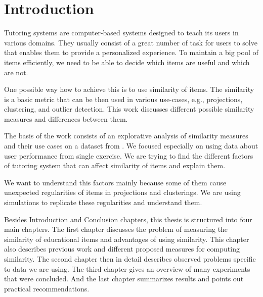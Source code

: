 \documentclass[
  printed, %
  table,   %
  nolof,     %
  nolot,     %
  color,
  final,
  nocover
]{fithesis3}
\begin{document}



\chapter*{Introduction}


Tutoring systems are computer-based systems designed to teach its users in various domains. They usually consist of a great number of task for users to solve that enables them to provide a personalized experience. To maintain a big pool of items efficiently, we need to be able to decide which items are useful and which are not.


One possible way how to achieve this is to use similarity of items. The similarity is a basic metric that can be then used in various use-cases, e.g., projections, clustering, and outlier detection. This work discusses different possible similarity measures and differences between them.


The basis of the work consists of an explorative analysis of similarity measures and their use cases on a dataset from \umimeCesky{}. We focused especially on using data about user performance from single exercise. We are trying to find the different factors of tutoring system that can affect similarity of items and explain them.


We want to understand this factors mainly because some of them cause unexpected regularities of items in projections and clusterings. We are using simulations to replicate these regularities and understand them.


Besides Introduction and Conclusion chapters, this thesis is structured into four main chapters. The first chapter discusses the problem of measuring the similarity of educational items and advantages of using similarity. This chapter also describes previous work and different proposed measures for computing similarity. The second chapter then in detail describes observed problems specific to data we are using. The third chapter gives an overview of many experiments that were concluded. And the last chapter summarizes results and points out practical recommendations.
\end{document}
